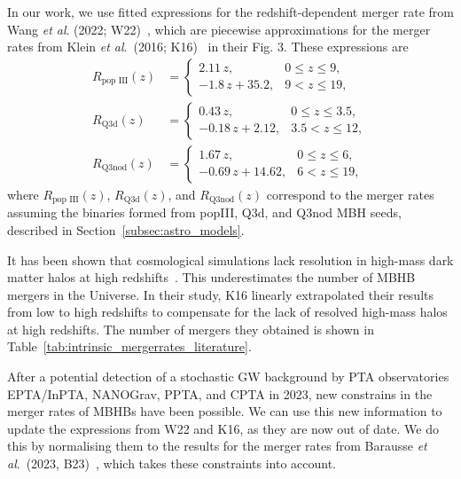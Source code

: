 \documentclass[a4paper,12pt]{article}
\begin{document}
In our work, we use fitted expressions for the redshift-dependent merger rate from Wang \textit{et al}. (2022; W22)~\cite{wang2022forecast}, which are piecewise approximations for the merger rates from Klein \textit{et al}.\ (2016; K16)~\cite{klein2016science} in their Fig. 3. These expressions are
\begin{subequations}
\label{eq:mergerrates_wang}
\begin{align}
R_{\text{pop III}}(z) &=
\begin{cases}
2.11\, z, & 0 \le z \le 9,\\[2pt]
-1.8\, z + 35.2, & 9 < z \le 19,
\end{cases}
\label{eq:mergerrates_wang:popIII}\\[6pt]
R_{\mathrm{Q3d}}(z) &=
\begin{cases}
0.43\, z, & 0 \le z \le 3.5,\\[2pt]
-0.18\, z + 2.12, & 3.5 < z \le 12,
\end{cases}
\label{eq:mergerrates_wang:Q3d}\\[6pt]
R_{\mathrm{Q3nod}}(z) &=
\begin{cases}
1.67\, z, & 0 \le z \le 6,\\[2pt]
-0.69\, z + 14.62, & 6 < z \le 19,
\end{cases}
\label{eq:mergerrates_wang:Q3nod}
\end{align}
\end{subequations}
where $R_{\text{pop III}}(z)$, $R_{\mathrm{Q3d}}(z)$, and $R_{\mathrm{Q3nod}}(z)$ correspond to the merger rates assuming the binaries formed from popIII, Q3d, and Q3nod MBH seeds, described in Section~\ref{subsec:astro_models}.

It has been shown that cosmological simulations lack resolution in high-mass dark matter halos at high redshifts~\cite{klein2016science}. This underestimates the number of MBHB mergers in the Universe. In their study, K16 linearly extrapolated their results from low to high redshifts to compensate for the lack of resolved high-mass halos at high redshifts. The number of mergers they obtained is shown in Table~\ref{tab:intrinsic_mergerrates_literature}.

After a potential detection of a stochastic GW background by PTA observatories EPTA/InPTA\cite{antoniadis2023second}, NANOGrav\cite{arzoumanian2020nanograv}, PPTA\cite{reardon2023search}, and CPTA\cite{xu2023searching} in 2023, new constrains in the merger rates of MBHBs have been possible. We can use this new information to update the expressions from W22 and K16, as they are now out of date.
We do this by normalising them to the results for the merger rates from Barausse \textit{et al}.\ (2023, B23)~\cite{barausse2023implications}, which takes these constraints into account. 
\end{document}
